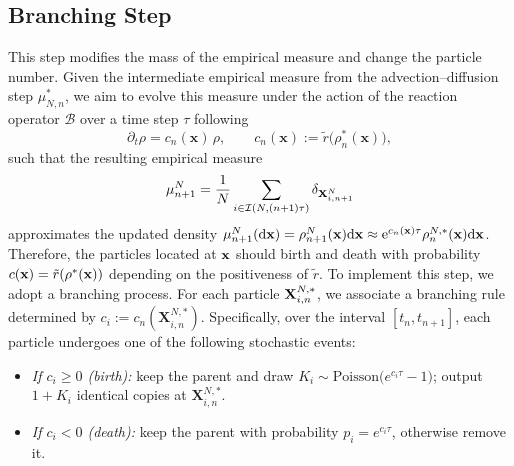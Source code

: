 \documentclass[a4paper,fleqn]{cas-sc}
\theoremstyle{definition}
\theoremstyle{remark}
\begin{document}
\subsection{Branching Step}
\label{sec:branching}
This step modifies the mass of the empirical measure and change the particle number. Given the intermediate empirical measure from the advection--diffusion step $\mu_{N,n}^*$, we aim to evolve this measure under the action of the reaction operator $\mathcal  B$ over a time step $\tau$ following
\[
\partial_t \rho = c_n(\mathbf{x})\,\rho,
\qquad c_n(\mathbf{x}) := \tilde r\!\big(\rho_n^\ast(\mathbf{x})\big),
\]
such that the resulting empirical measure
\begin{equation}
    \mu^N_{n+1} = \frac{1}{N} \sum_{i\in \mathcal I (N,(n+1)\tau)} \delta_{\mathbf{X}^N_{i,n+1}}
\end{equation}
approximates the updated density $\mu^N_{n+1}(\mathrm{d} \mathbf{x} ) = \rho^N_{n+1}(\mathbf{x}) \mathrm{d} \mathbf{x} \approx {\rm e}^{c_n(\mathbf{x}) \tau} \rho_{n}^{N,*}(\mathbf{x}) \mathrm{d} \mathbf{x}$. Therefore, the particles located at $\mathbf{x}$ should birth and death with probability $c(\mathbf{x})=\tilde r(\rho^*(\mathbf{x}))$ depending on the positiveness of $\tilde r$.
To implement this step, we adopt a branching process. For each particle $\mathbf{X}^{N,\ast}_{i,n}$, we associate a branching rule determined by $c_i:=c_n(\mathbf X^{N,\ast}_{i,n})$. Specifically, over the interval $[t_n,t_{n+1}]$, each particle undergoes one of the following stochastic events:
\begin{itemize}
  \item \emph{If \(c_i\ge 0\) (birth):} keep the parent and draw \(K_i\sim \mathrm{Poisson}\!\big(e^{c_i\tau}-1\big)\); output \(1+K_i\) identical copies at \(\mathbf X^{N,\ast}_{i,n}\).
  \item \emph{If \(c_i<0\) (death):} keep the parent with probability \(p_i=e^{c_i\tau}\), otherwise remove it.
\end{itemize}
\end{document}
